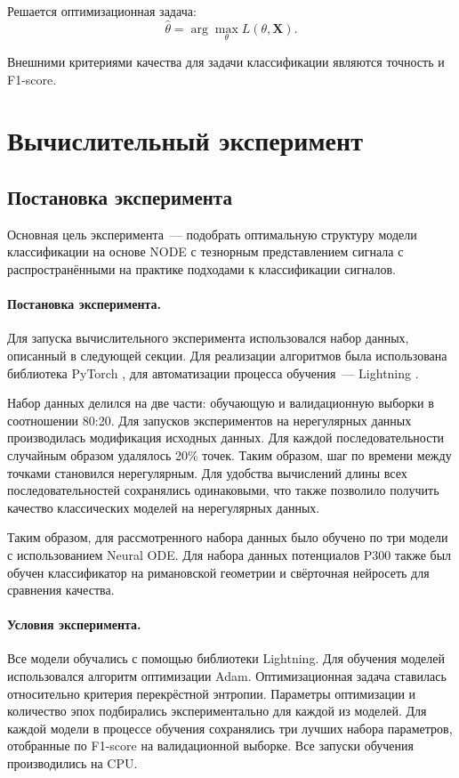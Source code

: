 \documentclass[a4paper, 12pt]{article} %
\newcommand{\X}{\mathbf{X}}
\begin{document}
    Решается оптимизационная задача:
    \begin{equation*}
    \hat{\theta} = \arg\max_{\theta} L(\theta, \X).
    \end{equation*}
    
    Внешними критериями качества для задачи классификации являются точность и F1-score.

\section{Вычислительный эксперимент}
\subsection{Постановка эксперимента}
Основная цель эксперимента~--- подобрать оптимальную структуру модели классификации на основе NODE с тезнорным представлением сигнала  с распространёнными на практике подходами к классификации сигналов.
    
    \paragraph{Постановка эксперимента.}
    Для запуска вычислительного эксперимента использовался набор данных, описанный в следующей секции. Для реализации алгоритмов была использована библиотека PyTorch \cite{pytorch}, для автоматизации процесса обучения~--- Lightning \cite{lightning}.
    
    Набор данных делился на две части: обучающую и валидационную выборки в соотношении 80:20. Для запусков экспериментов на нерегулярных данных производилась модификация исходных данных. Для каждой последовательности случайным образом удалялось 20\% точек. Таким образом, шаг по времени между точками становился нерегулярным. Для удобства вычислений длины всех последовательностей сохранялись одинаковыми, что также позволило получить качество классических моделей на нерегулярных данных. 
    
    Таким образом, для рассмотренного набора данных было обучено по три модели с использованием Neural ODE. Для набора данных потенциалов P300 также был обучен классификатор на римановской геометрии и свёрточная нейросеть для сравнения качества.
    
    
    \paragraph{Условия эксперимента.}
    Все модели обучались с помощью библиотеки Lightning. Для обучения моделей использовался алгоритм оптимизации Adam. Оптимизационная задача ставилась относительно критерия перекрёстной энтропии. Параметры оптимизации и количество эпох подбирались экспериментально для каждой из моделей. Для каждой модели в процессе обучения сохранялись три лучших набора параметров, отобранные по F1-score на валидационной выборке.
    Все запуски обучения производились на CPU.
\end{document}
